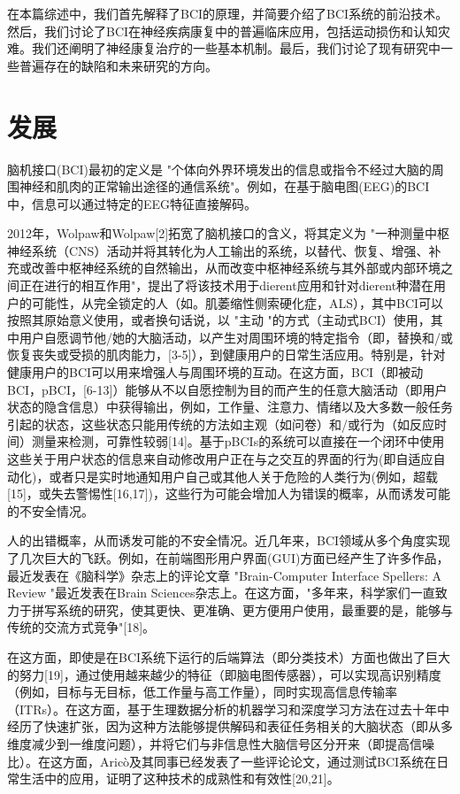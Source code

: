 \documentclass[UTF8,a4paper]{ctexart}
\begin{document}
\par
在本篇综述中，我们首先解释了BCI的原理，并简要介绍了BCI系统的前沿技术。然后，我们讨论了BCI在神经疾病康复中的普遍临床应用，包括运动损伤和认知灾难。我们还阐明了神经康复治疗的一些基本机制。最后，我们讨论了现有研究中一些普遍存在的缺陷和未来研究的方向。

\section{发展}
脑机接口(BCI)最初的定义是 "个体向外界环境发出的信息或指令不经过大脑的周围神经和肌肉的正常输出途径的通信系统"。例如，在基于脑电图(EEG)的BCI中，信息可以通过特定的EEG特征直接解码。
\par
2012年，Wolpaw和Wolpaw[2]拓宽了脑机接口的含义，将其定义为 "一种测量中枢神经系统（CNS）活动并将其转化为人工输出的系统，以替代、恢复、增强、补充或改善中枢神经系统的自然输出，从而改变中枢神经系统与其外部或内部环境之间正在进行的相互作用"，提出了将该技术用于dierent应用和针对dierent种潜在用户的可能性，从完全锁定的人（如。肌萎缩性侧索硬化症，ALS），其中BCI可以按照其原始意义使用，或者换句话说，以 "主动 "的方式（主动式BCI）使用，其中用户自愿调节他/她的大脑活动，以产生对周围环境的特定指令（即，替换和/或恢复丧失或受损的肌肉能力，[3-5]），到健康用户的日常生活应用。特别是，针对健康用户的BCI可以用来增强人与周围环境的互动。在这方面，BCI（即被动BCI，pBCI，[6-13]）能够从不以自愿控制为目的而产生的任意大脑活动（即用户状态的隐含信息）中获得输出，例如，工作量、注意力、情绪以及大多数一般任务引起的状态，这些状态只能用传统的方法如主观（如问卷）和/或行为（如反应时间）测量来检测，可靠性较弱[14]。基于pBCIs的系统可以直接在一个闭环中使用这些关于用户状态的信息来自动修改用户正在与之交互的界面的行为(即自适应自动化)，或者只是实时地通知用户自己或其他人关于危险的人类行为(例如，超载[15]，或失去警惕性[16,17])，这些行为可能会增加人为错误的概率，从而诱发可能的不安全情况。
\par
人的出错概率，从而诱发可能的不安全情况。近几年来，BCI领域从多个角度实现了几次巨大的飞跃。例如，在前端图形用户界面(GUI)方面已经产生了许多作品，最近发表在《脑科学》杂志上的评论文章 "Brain-Computer Interface Spellers: A Review "最近发表在Brain Sciences杂志上。在这方面，"多年来，科学家们一直致力于拼写系统的研究，使其更快、更准确、更方便用户使用，最重要的是，能够与传统的交流方式竞争"[18]。
\par
在这方面，即使是在BCI系统下运行的后端算法（即分类技术）方面也做出了巨大的努力[19]，通过使用越来越少的特征（即脑电图传感器），可以实现高识别精度（例如，目标与无目标，低工作量与高工作量），同时实现高信息传输率（ITRs）。在这方面，基于生理数据分析的机器学习和深度学习方法在过去十年中经历了快速扩张，因为这种方法能够提供解码和表征任务相关的大脑状态（即从多维度减少到一维度问题），并将它们与非信息性大脑信号区分开来（即提高信噪比）。在这方面，Aricò及其同事已经发表了一些评论论文，通过测试BCI系统在日常生活中的应用，证明了这种技术的成熟性和有效性[20,21]。
\end{document}
